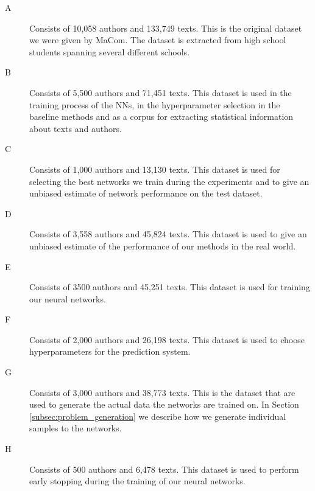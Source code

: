 \begin{description}

    \item[\gls{A}]

        Consists of 10,058 authors and 133,749 texts. This is the original
        dataset we were given by MaCom. The dataset is extracted from high
        school students spanning several different schools.

    \item[\gls{B}]

        Consists of 5,500 authors and 71,451 texts. This dataset is used in
        the training process of the \glspl{NN}, in the hyperparameter selection
        in the baseline methods and as a corpus for extracting statistical
        information about texts and authors.

    \item[\gls{C}]

        Consists of 1,000 authors and 13,130 texts. This dataset is used for
        selecting the best networks we train during the experiments and to give
        an unbiased estimate of network performance on the test dataset.

    \item[\gls{D}]

        Consists of 3,558 authors and 45,824 texts. This dataset is used to
        give an unbiased estimate of the performance of our methods in the real
        world.

    \item[\gls{E}]

        Consists of 3500 authors and 45,251 texts. This dataset is used for
        training our neural networks.

    \item[\gls{F}]

        Consists of 2,000 authors and 26,198 texts. This dataset is used to
        choose hyperparameters for the prediction system.

    \item[\gls{G}]

        Consists of 3,000 authors and 38,773 texts. This is the dataset that are
        used to generate the actual data the networks are trained on. In Section
        \ref{subsec:problem_generation} we describe how we generate individual
        samples to the networks.

    \item[\gls{H}]

        Consists of 500 authors and 6,478 texts. This dataset is used to perform
        early stopping during the training of our neural networks.


\end{description}
